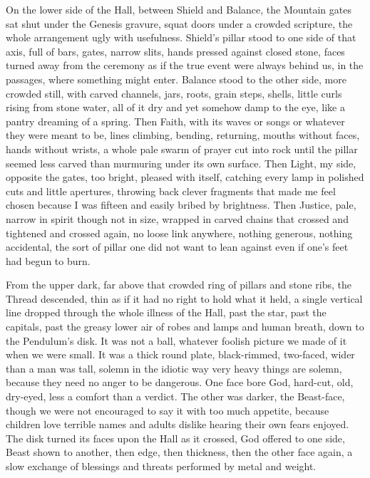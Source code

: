 On the lower side of the Hall, between Shield and Balance, the Mountain gates sat shut under the Genesis gravure, 
squat doors under a crowded scripture, the whole arrangement ugly with usefulness. 
Shield’s pillar stood to one side of that axis, full of bars, gates, narrow slits, hands pressed against closed stone, 
faces turned away from the ceremony as if the true event were always behind us, in the passages, where something might enter. 
Balance stood to the other side, more crowded still, with carved channels, jars, roots, grain steps, shells, little curls rising from stone water, 
all of it dry and yet somehow damp to the eye, like a pantry dreaming of a spring. 
Then Faith, with its waves or songs or whatever they were meant to be, lines climbing, bending, returning, mouths without faces, hands without wrists, 
a whole pale swarm of prayer cut into rock until the pillar seemed less carved than murmuring under its own surface. 
Then Light, my side, opposite the gates, too bright, pleased with itself, catching every lamp in polished cuts and little apertures, 
throwing back clever fragments that made me feel chosen because I was fifteen and easily bribed by brightness. 
Then Justice, pale, narrow in spirit though not in size, wrapped in carved chains that crossed and tightened and crossed again, no loose link anywhere, 
nothing generous, nothing accidental, the sort of pillar one did not want to lean against even if one’s feet had begun to burn. \par


From the upper dark, far above that crowded ring of pillars and stone ribs, the Thread descended, thin as if it had no right to hold what it held, 
a single vertical line dropped through the whole illness of the Hall, past the star, past the capitals, past the greasy lower air of robes and 
lamps and human breath, down to the Pendulum’s disk. 
It was not a ball, whatever foolish picture we made of it when we were small. 
It was a thick round plate, black-rimmed, two-faced, wider than a man was tall, solemn in the idiotic way very heavy things are solemn, because they need no anger to be dangerous. 
One face bore God, hard-cut, old, dry-eyed, less a comfort than a verdict. 
The other was darker, the Beast-face, though we were not encouraged to say it with too much appetite, because children love terrible names and 
adults dislike hearing their own fears enjoyed. 
The disk turned its faces upon the Hall as it crossed, God offered to one side, Beast shown to another, then edge, then thickness, then the other face again, 
a slow exchange of blessings and threats performed by metal and weight.\par

